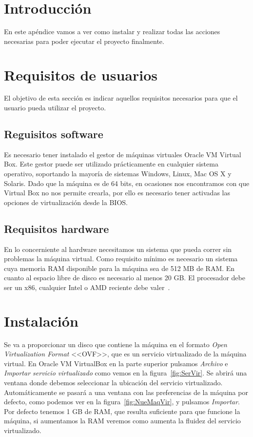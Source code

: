\label{anexo:usuario}

\section{Introducción}
En este apéndice vamos a ver como instalar y realizar todas las acciones necesarias para poder ejecutar el proyecto finalmente.

\section{Requisitos de usuarios}
El objetivo de esta sección es indicar aquellos requisitos necesarios para que el usuario pueda utilizar el proyecto.

\subsection{Reguisitos software}
Es necesario tener instalado el gestor de máquinas virtuales Oracle VM Virtual Box. Este gestor puede ser utilizado prácticamente en cualquier sistema operativo, soportando la mayoría de sistemas Windows, Linux, Mac OS X y Solaris. Dado que la máquina es de 64 bits, en ocasiones nos encontramos con que Virtual Box no nos permite crearla, por ello es necesario tener activadas las opciones de virtualización desde la BIOS.

\subsection{Requisitos hardware}
En lo concerniente al hardware necesitamos un sistema que pueda correr sin problemas la máquina virtual. Como requisito mínimo es necesario un sistema cuya memoria RAM disponible para la máquina sea de 512 MB de RAM. En cuanto al espacio libre de disco es necesario al menos 20 GB. El procesador debe ser un x86, cualquier Intel o AMD reciente debe valer~\cite{requeriments_VirtualBox}.


\section{Instalación}
Se va a proporcionar un disco que contiene la máquina en el formato \textit{Open Virtualization Format} <<OVF>>, que es un servicio virtualizado de la máquina virtual. En Oracle VM VirtualBox en la parte superior pulsamos \textit{Archivo} e \textit{Importar servicio virtualizado} como vemos en la figura~\ref{fig:SerVir}. Se abrirá una ventana donde debemos seleccionar la ubicación del servicio virtualizado. Automáticamente se pasará a una ventana con las preferencias de la máquina por defecto, como podemos ver en la figura~\ref{fig:NueMaqVir}, y pulsamos \textit{Importar}. Por defecto tenemos 1 GB de RAM, que resulta suficiente para que funcione la máquina, si aumentamos la RAM veremos como aumenta la fluidez del servicio virtualizado.

